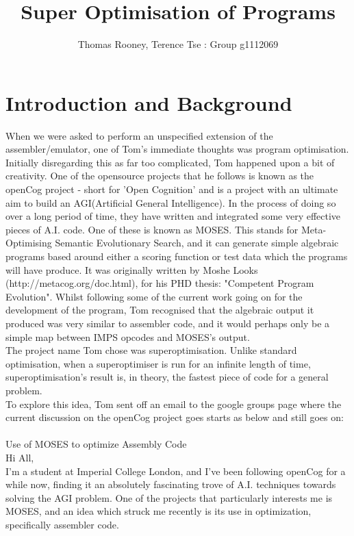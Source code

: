 \documentclass[11pt]{article}
\begin{document}
\title{Super Optimisation of Programs}
\author{Thomas Rooney, Terence Tse : Group g1112069}
\maketitle

\section{Introduction and Background}
\indent When we were asked to perform an unspecified extension of the assembler/emulator, one of Tom's immediate thoughts was program optimisation. Initially disregarding this as far too complicated, Tom happened upon a bit of creativity. One of the opensource projects that he follows is known as the openCog project - short for 'Open Cognition' and is a project with an ultimate aim to build an AGI(Artificial General Intelligence). In the process of doing so over a long period of time, they have written and integrated some very effective pieces of A.I. code. 
One of these is known as MOSES. This stands for Meta-Optimising Semantic Evolutionary Search, and it can generate simple algebraic programs based around either a scoring function or test data which the programs will have produce. It was originally written by Moshe Looks (http://metacog.org/doc.html), for his PHD thesis: "Competent Program Evolution". Whilst following some of the current work going on for the development of the program, Tom recognised that the algebraic output it produced was very similar to assembler code, and it would perhaps only be a simple map between IMPS opcodes and MOSES's output. 
\\
\indent The project name Tom chose was superoptimisation. Unlike standard optimisation, when a superoptimiser is run for an infinite length of time, superoptimisation's result is, in theory, the fastest piece of code for a general problem.
\\
\indent To explore this idea, Tom sent off an email to the google groups page where the current discussion on the openCog project goes starts as below and still goes on:
\\
\\
Use of MOSES to optimize Assembly Code
\\
Hi All,
\\
I'm a student at Imperial College London, and I've been following
openCog for a while now, finding it an absolutely fascinating trove of A.I. techniques towards solving the AGI problem. One of the projects that particularly interests me is MOSES, and an idea which struck me recently is its use in optimization, specifically assembler code. 
\end{document}
